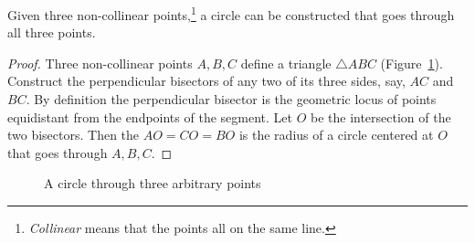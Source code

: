 \begin{theorem}\label{thm.three-points}
Given three non-collinear points,\footnote{\emph{Collinear} means that the points all on the same line.} a circle can be constructed that goes through all three points.
\end{theorem}

\begin{proof}
Three non-collinear points $A,B,C$ define a triangle $\triangle ABC$ (Figure~\ref{f.kepler-circumscribed}). Construct the perpendicular bisectors of any two of its three sides, say, $AC$ and $BC$. By definition the perpendicular bisector is the geometric locus of points equidistant from the endpoints of the segment. Let $O$ be the intersection of the two bisectors. Then the $AO=CO=BO$ is the radius of a circle centered at $O$ that goes through $A,B,C$.\hqed
\end{proof}

\begin{figure}
\begin{center}
\caption{A circle through three arbitrary points}\label{f.kepler-circumscribed}
\end{center}
\end{figure}

